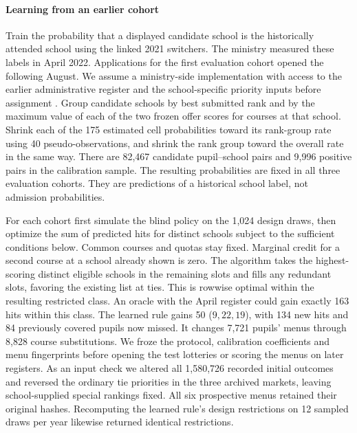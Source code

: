 \paragraph{Learning from an earlier cohort}
Train the probability that a displayed candidate school is the historically attended school using the linked 2021 switchers. The ministry measured these labels in April 2022. Applications for the first evaluation cohort opened the following August. We assume a ministry-side implementation with access to the earlier administrative register and the school-specific priority inputs before assignment \citep{registerdata,saecalendar2022}. Group candidate schools by best submitted rank and by the maximum value of each of the two frozen offer scores for courses at that school. Shrink each of the 175 estimated cell probabilities toward its rank-group rate using 40 pseudo-observations, and shrink the rank group toward the overall rate in the same way. There are 82,467 candidate pupil--school pairs and 9,996 positive pairs in the calibration sample. The resulting probabilities are fixed in all three evaluation cohorts. They are predictions of a historical school label, not admission probabilities.

For each cohort first simulate the blind policy on the 1,024 design draws, then optimize the sum of predicted hits for distinct schools subject to the sufficient conditions below. Common courses and quotas stay fixed. Marginal credit for a second course at a school already shown is zero. The algorithm takes the highest-scoring distinct eligible schools in the remaining slots and fills any redundant slots, favoring the existing list at ties. This is rowwise optimal within the resulting restricted class. An oracle with the April register could gain exactly 163 hits within this class. The learned rule gains 50 ($9,22,19$), with 134 new hits and 84 previously covered pupils now missed. It changes 7,721 pupils' menus through 8,828 course substitutions. We froze the protocol, calibration coefficients and menu fingerprints before opening the test lotteries or scoring the menus on later registers. As an input check we altered all 1,580,726 recorded initial outcomes and reversed the ordinary tie priorities in the three archived markets, leaving school-supplied special rankings fixed. All six prospective menus retained their original hashes. Recomputing the learned rule's design restrictions on 12 sampled draws per year likewise returned identical restrictions.



